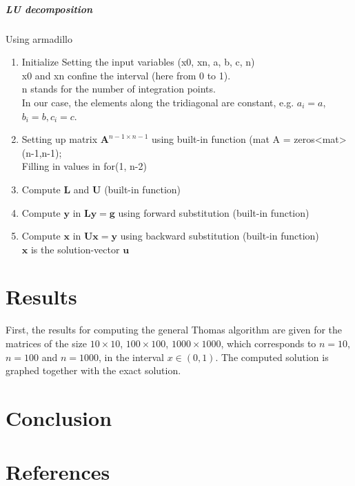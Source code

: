 \documentclass[%
oneside,                 %
final,                   %
10pt]{article}
\begin{document}
\subparagraph{LU decomposition}
Using armadillo 
\begin{enumerate}
\item Initialize Setting the input variables (x0, xn, a, b, c, n) \\
	x0 and xn confine the interval (here from 0 to 1). \\
	n stands for the number of integration points. \\
	In our case, the elements along the tridiagonal are constant, e.g. $a_i=a$, $b_i=b, c_i=c$. 

\item Setting up matrix $\mathbf{A}^{n-1 \times n-1}$ using built-in function (mat A = zeros<mat>(n-1,n-1);\\
	 Filling in values in for(1, 
		n-2)
		
\item Compute $\mathbf{L}$ and $\mathbf{U}$ (built-in function)

\item Compute $\mathbf{y}$ in $\mathbf{Ly}=\mathbf{g}$ using forward substitution (built-in function)

\item Compute $\mathbf{x}$ in $\mathbf{Ux}=\mathbf{y}$ using backward substitution (built-in function)\\
		$\mathbf{x}$ is the solution-vector $\mathbf{u}$ 
\end{enumerate}
\section{Results}
First, the results for computing the general Thomas algorithm are given for the matrices of the size $10 \times 10$, $100 \times 100$, $1000 \times 1000$, which corresponds to $n=10$, $n=100$ and $n=1000$, in the interval $x \in (0,1)$. The computed solution is graphed together with the exact solution.

\section{Conclusion}
\section{References}











\end{document}
